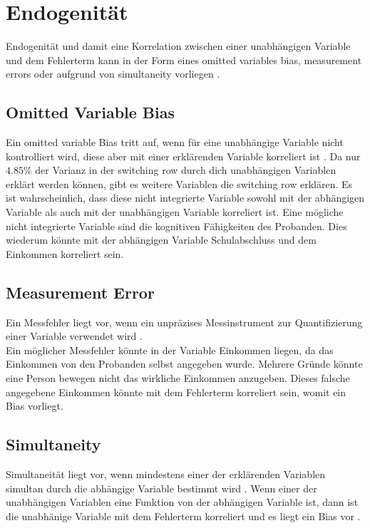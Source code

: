 \documentclass[11pt,a4paper]{article}
\begin{document}
\section{Endogenität}
Endogenität und damit eine Korrelation zwischen einer unabhängigen Variable und dem Fehlerterm kann in der Form eines omitted variables bias, measurement errors oder aufgrund von simultaneity vorliegen \parencite{wooldridge2010econometric}. 

\subsection{Omitted Variable Bias}
Ein omitted variable Bias tritt auf, wenn für eine unabhängige Variable nicht kontrolliert wird, diese aber mit einer erklärenden Variable korreliert ist \parencite{wooldridge2010econometric}. Da nur $4.85\%$ der Varianz in der switching row durch dich unabhängigen Variablen erklärt werden können, gibt es weitere Variablen die switching row erklären. Es ist wahrscheinlich, dass diese nicht integrierte Variable sowohl mit der abhängigen Variable als auch mit der unabhängigen Variable korreliert ist. Eine mögliche nicht integrierte Variable sind die kognitiven Fähigkeiten des Probanden. Dies wiederum könnte mit der abhängigen Variable Schulabschluss und dem Einkommen korreliert sein.\\

\subsection{Measurement Error}
Ein Messfehler liegt vor, wenn ein unpräzises Messinstrument zur Quantifizierung einer Variable verwendet wird \parencite{wooldridge2015introductory}.\\

Ein möglicher Messfehler könnte in der Variable Einkommen liegen, da das Einkommen von den Probanden selbst angegeben wurde. Mehrere Gründe könnte eine Person bewegen nicht das wirkliche Einkommen anzugeben. Dieses falsche angegebene Einkommen könnte mit dem Fehlerterm korreliert sein, womit ein Bias vorliegt.\\
 


\subsection{Simultaneity}
Simultaneität liegt vor, wenn mindestens einer der erklärenden Variablen simultan durch die abhängige Variable bestimmt wird \parencite{wooldridge2010econometric}. Wenn einer der unabhängigen Variablen eine Funktion von der abhängigen Variable ist, dann ist die unabhänige Variable mit dem Fehlerterm korreliert und es liegt ein Bias vor \parencite{wooldridge2010econometric}.\\
\end{document}
